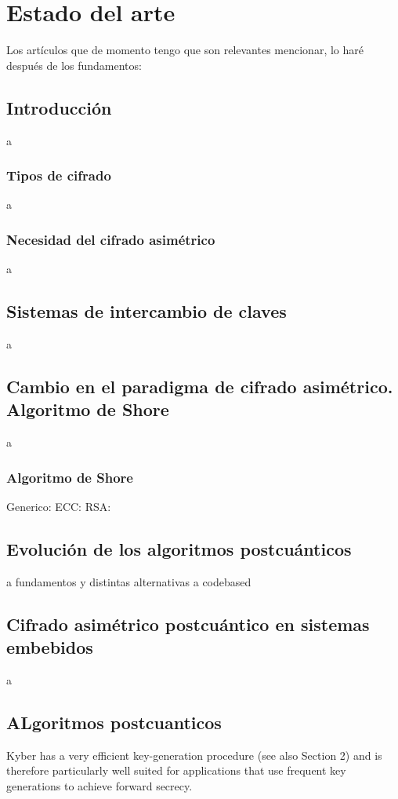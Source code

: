 \chapter{Estado del arte}
Los artículos que de momento tengo que son relevantes mencionar, lo haré después de los fundamentos:
\cite{NIST_IR_8413_2022} \cite{NIST_IR_8545_2025} \cite{011318_1_5.0179566} \cite{s11042-024-20535-x} \cite{A_COMPARATIVE_REVIEW_OF_DATA_ENCRYPTION_METHODS_IN_THE_USA_AND_EUROPE} \cite{An_Overview_and_Analysis_of_Hybrid_Encryption_The_Combination_of_Symmetric_Encryption_and_Asymmetric_Encryption} \cite{Comparative_Analysis_of_Energy_Costs_of_Asymmetric_vs_Symmetric_Encryption-Based_Security_Applications} \cite{First-Order-Masked-Kyber-on-ARM-Cortex-M4} \cite{2022-414} \cite{An_overview_of_Quantum_Cryptography_and} \cite{2502.12252v1} \cite{Quantum_Resistance_Saber-Based_Group_Key_Exchange_Protocol_for_IoT} \cite{NISTFIPS203}
\section{Introducción}
a
\subsection{Tipos de cifrado}
a
\subsection{Necesidad del cifrado asimétrico}
a
\section{Sistemas de intercambio de claves}
a
\section{Cambio en el paradigma de cifrado asimétrico. Algoritmo de Shore}
a
\subsection{Algoritmo de Shore}
Generico: \cite{9508027v2} ECC: \cite{0301141v2} RSA: \cite{RESERCHFINAL}
\section{Evolución de los algoritmos postcuánticos}
a fundamentos y distintas alternativas a codebased \cite{SurveyCOdeBAsed}
\section{Cifrado asimétrico postcuántico en sistemas embebidos}
a
\section{ALgoritmos postcuanticos}

Kyber has a very efficient key-generation procedure (see also Section 2) and is therefore particularly well
suited for applications that use frequent key generations to achieve forward secrecy. \cite{kyber-spec-2021}